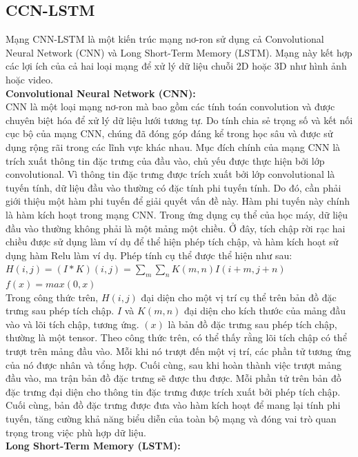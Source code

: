 \documentclass[conference]{IEEEtran}
\begin{document}
	\subsection{CCN-LSTM}
	Mạng CNN-LSTM là một kiến trúc mạng nơ-ron sử dụng cả Convolutional Neural Network (CNN) và Long Short-Term Memory (LSTM). Mạng này kết hợp các lợi ích của cả hai loại mạng để xử lý dữ liệu chuỗi 2D hoặc 3D như hình ảnh hoặc video.\\
	\textbf{Convolutional Neural Network (CNN):}\\
	CNN là một loại mạng nơ-ron mà bao gồm các tính toán convolution và được chuyên biệt hóa để xử lý dữ liệu lưới tương tự. Do tính chia sẻ trọng số và kết nối cục bộ của mạng CNN, chúng đã đóng góp đáng kể trong học sâu và được sử dụng rộng rãi trong các lĩnh vực khác nhau. Mục đích chính của mạng CNN là trích xuất thông tin đặc trưng của đầu vào, chủ yếu được thực hiện bởi lớp convolutional. Vì thông tin đặc trưng được trích xuất bởi lớp convolutional là tuyến tính, dữ liệu đầu vào thường có đặc tính phi tuyến tính. Do đó, cần phải giới thiệu một hàm phi tuyến để giải quyết vấn đề này. Hàm phi tuyến này chính là hàm kích hoạt trong mạng CNN. Trong ứng dụng cụ thể của học máy, dữ liệu đầu vào thường không phải là một mảng một chiều. Ở đây, tích chập rời rạc hai chiều được sử dụng làm ví dụ để thể hiện phép tích chập, và hàm kích hoạt sử dụng hàm Relu làm ví dụ. Phép tính cụ thể được thể hiện như sau:\\
	$H(i,j) = (I*K)(i,j) = \sum_{m}\sum_{n} K(m,n)I(i+m, j+n)$\\
	$f(x) = max(0,x)$\\
	Trong công thức trên, $H(i,j)$ đại diện cho một vị trí cụ thể trên bản đồ đặc trưng sau phép tích chập. $I$ và $K(m,n)$ đại diện cho kích thước của mảng đầu vào và lõi tích chập, tương ứng. $(x)$ là bản đồ đặc trưng sau phép tích chập, thường là một tensor. Theo công thức trên, có thể thấy rằng lõi tích chập có thể trượt trên mảng đầu vào. Mỗi khi nó trượt đến một vị trí, các phần tử tương ứng của nó được nhân và tổng hợp. Cuối cùng, sau khi hoàn thành việc trượt mảng đầu vào, ma trận bản đồ đặc trưng sẽ được thu được. Mỗi phần tử trên bản đồ đặc trưng đại diện cho thông tin đặc trưng được trích xuất bởi phép tích chập. Cuối cùng, bản đồ đặc trưng được đưa vào hàm kích hoạt để mang lại tính phi tuyến, tăng cường khả năng biểu diễn của toàn bộ mạng và đóng vai trò quan trọng trong việc phù hợp dữ liệu.\\
	\textbf{Long Short-Term Memory (LSTM):}\\
\end{document}
